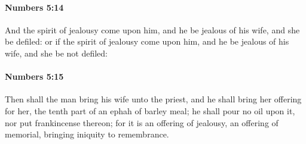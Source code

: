 		\paragraph{Numbers 5:14} %
			\label{NUMBERS-5-14}

			And the spirit of jealousy come upon him, and he be jealous of his wife, and she be defiled: or if the spirit of jealousy come upon him, and he be jealous of his wife, and she be not defiled:


		\paragraph{Numbers 5:15} %
			\label{NUMBERS-5-15}

			Then shall the man bring his wife unto the priest, and he shall bring her offering for her, the tenth part of an ephah of barley meal; he shall pour no oil upon it, nor put frankincense thereon; for it is an offering of jealousy, an offering of memorial, bringing iniquity to remembrance.

